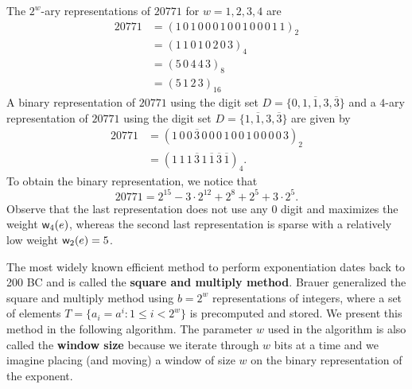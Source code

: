 \begin{exmp}
The $2^w$-ary representations of $20771$ for $w = 1, 2, 3, 4$ are 
\begin{align*}
    20771 &= (1\,0\,1\,0\,0\,0\,1\,0\,0\,1\,0\,0\,0\,1\,1)_2 \\
    &= (1\,1\,0\,1\,0\,2\,0\,3)_4 \\
    &= (5\,0\,4\,4\,3)_8 \\
    &= (5\,1\,2\,3)_{16}
\end{align*}
A binary representation of $20771$ using the digit set $D = \{0, 1, \overline1, 3, \overline3\}$ 
and a $4$-ary representation of $20771$ using the digit set $D = \{1, \overline1, 3, \overline3\}$ are given by 
\begin{align*}
    20771 &= (1\,0\,0\,\overline3\,0\,0\,0\,1\,0\,0\,1\,0\,0\,0\,0\,3)_2 \\
    &= (1\,1\,1\,\overline3\,1\,\overline1\,\overline3\,\overline1)_4.
\end{align*}
To obtain the binary representation, we notice that 
\[ 20771 = 2^{15} - 3 \cdot 2^{12} + 2^8 + 2^5 + 3 \cdot 2^5. \]
Observe that the last representation does not use any $0$ digit and maximizes the weight 
${\sf w}_4(e)$, whereas the second last representation is sparse with a relatively low weight ${\sf w}_2(e) = 5$.
\end{exmp}

The most widely known efficient method to perform exponentiation dates back to 200 BC and is called the 
{\bf square and multiply method}. Brauer \cite{bams/1183502136} generalized the square and multiply method using $b = 2^w$
representations of integers, where a set of elements $T = \{a_i = a^i : 1 \leq i < 2^w\}$ is 
precomputed and stored. We present this method in the following algorithm. The parameter 
$w$ used in the algorithm is also called the {\bf window size} because we iterate through $w$ 
bits at a time and we imagine placing (and moving) a window of size $w$ on the binary 
representation of the exponent. 

